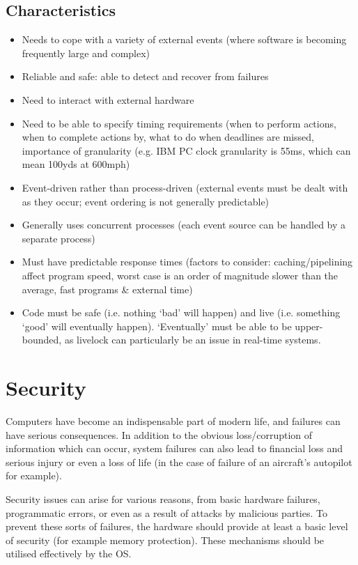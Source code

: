 \documentclass[a4paper,oneside]{report}
\begin{document}
  	\section{Characteristics}
  	
  	\begin{itemize}
  		\item Needs to cope with a variety of external events (where software is becoming frequently large and complex)
		\item Reliable and safe: able to detect and recover from failures
		\item Need to interact with external hardware
  		\item Need to be able to specify timing requirements (when to perform actions, when to complete actions by, what to do when deadlines are missed, importance of granularity (e.g. IBM PC clock granularity is 55ms, which can mean 100yds at 600mph)
  		\item Event-driven rather than process-driven (external events must be dealt with as they occur; event ordering is not generally predictable)
		\item Generally uses concurrent processes (each event source can be handled by a separate process)  
  		\item Must have predictable response times (factors to consider: caching/pipelining affect program speed, worst case is an order of magnitude slower than the average, fast programs \& external time)
  		\item Code must be safe (i.e. nothing `bad' will happen) and live (i.e. something `good' will eventually happen). `Eventually' must be able to be upper-bounded, as livelock can particularly be an issue in real-time systems.
  	\end{itemize}
  	
\chapter{Security}

	Computers have become an indispensable part of modern life, and failures can have serious consequences. In addition to the obvious loss/corruption of information which can occur, system failures can also lead to financial loss and serious injury or even a loss of life (in the case of failure of an aircraft's autopilot for example).
	
	Security issues can arise for various reasons, from basic hardware failures, programmatic errors, or even as a result of attacks by malicious parties. To prevent these sorts of failures, the hardware should provide at least a basic level of security (for example memory protection). These mechanisms should be utilised effectively by the OS.
	
\end{document}
